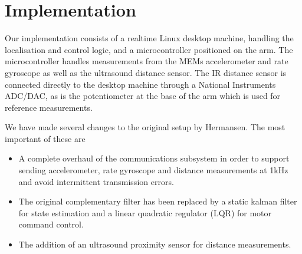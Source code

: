 \section{Implementation}\label{sec:implemenation}
Our implementation consists of a realtime Linux desktop machine, handling the
localisation and control logic, and a microcontroller positioned on the arm. The microcontroller handles measurements from the MEMs accelerometer and rate gyroscope as well as the ultrasound
distance sensor. The IR distance sensor is connected directly to the desktop machine through a National Instruments ADC/DAC, as is the 
potentiometer at the base of the arm which is used for reference measurements.

We have made several changes to the original setup by Hermansen. The most important of these are

\begin{itemize}
		\item A complete overhaul of the communications subsystem in order to support sending accelerometer, rate gyroscope and 
			distance measurements at 1kHz and avoid intermittent transmission errors. 
		\item The original complementary filter has been replaced by a static kalman filter for state estimation and a linear 
			quadratic regulator (LQR)\cite{Hendricks2008} for motor command control.
			\item The addition of an ultrasound proximity sensor for distance measurements.
\end{itemize}

